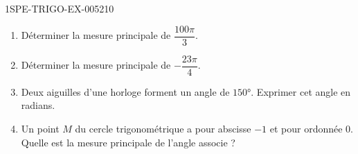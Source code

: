 \begin{exercice}{1SPE-TRIGO-EX-005}{2}{10}
\begin{enumerate}
  \item Déterminer la mesure principale de $\dfrac{100\pi}{3}$.
  \item Déterminer la mesure principale de $-\dfrac{23\pi}{4}$.
  \item Deux aiguilles d'une horloge forment un angle de $150°$. Exprimer cet angle en radians.
  \item Un point $M$ du cercle trigonométrique a pour abscisse $-1$ et pour ordonnée $0$. Quelle est la mesure principale de l'angle associe ?
\end{enumerate}
\end{exercice}
